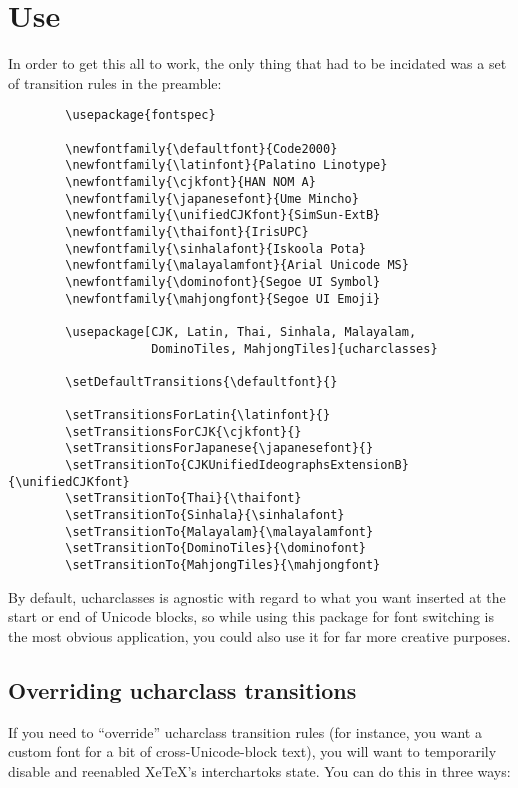 \documentclass{article}
\begin{document}
  \pagebreak

  \section{Use}

    In order to get this all to work, the only thing that had to be incidated was a set of transition rules in the preamble:

    \disableTransitionRules
    \begin{verbatim}
        \usepackage{fontspec}

        \newfontfamily{\defaultfont}{Code2000}
        \newfontfamily{\latinfont}{Palatino Linotype}
        \newfontfamily{\cjkfont}{HAN NOM A}
        \newfontfamily{\japanesefont}{Ume Mincho}
        \newfontfamily{\unifiedCJKfont}{SimSun-ExtB}
        \newfontfamily{\thaifont}{IrisUPC}
        \newfontfamily{\sinhalafont}{Iskoola Pota}
        \newfontfamily{\malayalamfont}{Arial Unicode MS}
        \newfontfamily{\dominofont}{Segoe UI Symbol}
        \newfontfamily{\mahjongfont}{Segoe UI Emoji}

        \usepackage[CJK, Latin, Thai, Sinhala, Malayalam,
                    DominoTiles, MahjongTiles]{ucharclasses}

        \setDefaultTransitions{\defaultfont}{}

        \setTransitionsForLatin{\latinfont}{}
        \setTransitionsForCJK{\cjkfont}{}
        \setTransitionsForJapanese{\japanesefont}{}
        \setTransitionTo{CJKUnifiedIdeographsExtensionB}{\unifiedCJKfont}
        \setTransitionTo{Thai}{\thaifont}
        \setTransitionTo{Sinhala}{\sinhalafont}
        \setTransitionTo{Malayalam}{\malayalamfont}
        \setTransitionTo{DominoTiles}{\dominofont}
        \setTransitionTo{MahjongTiles}{\mahjongfont}
    \end{verbatim}
    \enableTransitionRules

    By default, ucharclasses is agnostic with regard to what you want inserted at the start or end of Unicode blocks, so while using this package for font switching is the most obvious application, you could also use it for far more creative purposes.

  \pagebreak

    \subsection{Overriding ucharclass transitions}

      If you need to “override” ucharclass transition rules (for instance, you want a custom font for a bit of cross-Unicode-block text), you will want to temporarily disable and reenabled XeTeX's interchartoks state. You can do this in three ways:
\end{document}
